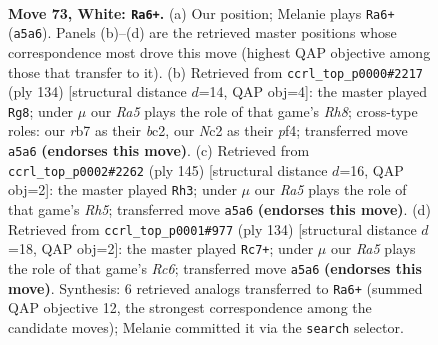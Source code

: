 \documentclass[11pt]{article}
\begin{document}
\clearpage

\begin{figure}[p]\centering
\begin{subfigure}{0.46\textwidth}\centering
\resizebox{\linewidth}{!}{%
\newchessgame
\chessboard[
  setfen={3R4/1r4b1/7k/R7/2P5/8/2N3K1/8 w - - 66 73},
  showmover=false,
  pgfstyle=straightmove, color=movearrow, markmove={a5-a6}
]}
\caption{}
\end{subfigure}\hfill
\begin{subfigure}{0.46\textwidth}\centering
\resizebox{\linewidth}{!}{%
\newchessgame
\chessboard[
  setfen={7R/2rk4/1R6/8/3K1p2/8/2b5/8 w - - 0 68},
  showmover=false,
  pgfstyle=straightmove, color=movearrow, markmove={h8-g8}
]}
\caption{}
\end{subfigure}
\\[4pt]
\begin{subfigure}{0.46\textwidth}\centering
\resizebox{\linewidth}{!}{%
\newchessgame
\chessboard[
  setfen={8/8/8/1n2k3/7r/3KB3/R7/8 b - - 0 73},
  showmover=false,
  pgfstyle=straightmove, color=movearrow, markmove={h4-h3}
]}
\caption{}
\end{subfigure}\hfill
\begin{subfigure}{0.46\textwidth}\centering
\resizebox{\linewidth}{!}{%
\newchessgame
\chessboard[
  setfen={6b1/5k2/2R5/5P2/8/2K5/4r3/8 w - - 6 68},
  showmover=false,
  pgfstyle=straightmove, color=movearrow, markmove={c6-c7}
]}
\caption{}
\end{subfigure}
\caption{\textbf{Move 73, White: \texttt{Ra6+}.} (a) Our position; Melanie plays \texttt{Ra6+} (\texttt{a5a6}). Panels (b)--(d) are the retrieved master positions whose correspondence most drove this move (highest QAP objective among those that transfer to it). (b) Retrieved from \texttt{ccrl\_top\_p0000\#2217} (ply 134) [structural distance $d$=14, QAP obj=4]: the master played \texttt{Rg8}; under $\mu$ our \emph{Ra5} plays the role of that game's \emph{Rh8}; cross-type roles: our \emph{r}b7 as their \emph{b}c2, our \emph{N}c2 as their \emph{p}f4; transferred move \texttt{a5a6} \textbf{(endorses this move)}. (c) Retrieved from \texttt{ccrl\_top\_p0002\#2262} (ply 145) [structural distance $d$=16, QAP obj=2]: the master played \texttt{Rh3}; under $\mu$ our \emph{Ra5} plays the role of that game's \emph{Rh5}; transferred move \texttt{a5a6} \textbf{(endorses this move)}. (d) Retrieved from \texttt{ccrl\_top\_p0001\#977} (ply 134) [structural distance $d$=18, QAP obj=2]: the master played \texttt{Rc7+}; under $\mu$ our \emph{Ra5} plays the role of that game's \emph{Rc6}; transferred move \texttt{a5a6} \textbf{(endorses this move)}. Synthesis: 6 retrieved analogs transferred to \texttt{Ra6+} (summed QAP objective 12, the strongest correspondence among the candidate moves); Melanie committed it via the \texttt{search} selector.}
\label{fig:thought-m144}
\end{figure}
\end{document}
